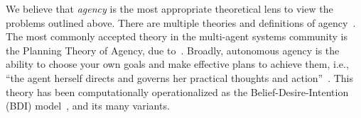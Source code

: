 
We believe that \emph{agency} is the most appropriate theoretical lens to view the problems outlined above. There are multiple
theories and definitions of agency~\cite[e.g.,][]{kiser99agency, shapiro05agency, Hodges2022agency, emirbayer98agency, Tasselli2021}.
The most commonly accepted theory in the multi-agent systems community is the Planning Theory of Agency, due to~\citet{Bratman1987intentions, 
bratman2007structures, bratman13shared_agency}. Broadly, autonomous agency is the ability to choose your own goals and make effective plans to 
achieve them, i.e., ``the agent herself directs and governs her practical thoughts and action''~\cite[p.4]{bratman2007structures}. This theory 
has been computationally operationalized as the Belief-Desire-Intention (BDI) model~\citep{rao1995bdi}, and its many variants.

